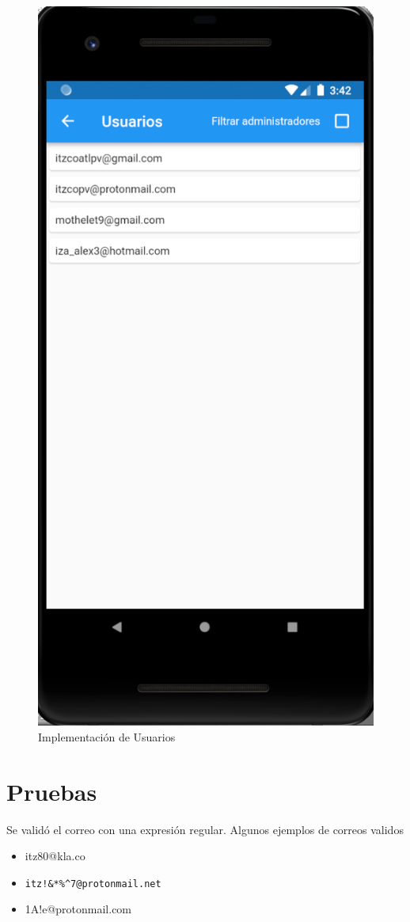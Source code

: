 \documentclass{article}
\begin{document}
\begin{figure}[H]
    \centering
    \includegraphics[scale=0.8]{imgs/Imp/Usuarios}
    \caption{Implementación de Usuarios}
\end{figure}
\section{Pruebas}%
Se validó el correo con una expresión regular. Algunos ejemplos de correos validos
\begin{itemize}
	\item itz80@kla.co
	\item \verb |itz!&*%
	\item 1A!e@protonmail.com
\end{itemize}

\pagebreak
\printbibliography
\end{document}

